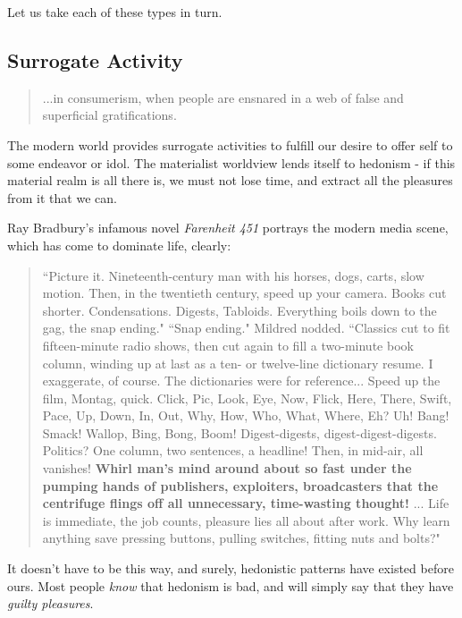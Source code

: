 \documentclass[letterpaper]{article}
\begin{document}
Let us take each of these types in turn.

\subsection{Surrogate Activity}

\begin{quote}
  ...in consumerism, when people are ensnared in a web of false and superficial gratifications.
\end{quote}

The modern world provides surrogate activities to fulfill our desire to offer self to some endeavor or idol. The materialist worldview lends itself to hedonism - if this material realm is all there is, we must not lose time, and extract all the pleasures from it that we can. 


Ray Bradbury's infamous novel \textit{Farenheit 451} portrays the modern media scene, which has come to dominate life, clearly:

\begin{quote}
  ``Picture it. Nineteenth-century man with his horses, dogs, carts, slow motion. Then, in the twentieth century, speed up your camera. Books cut shorter. Condensations. Digests, Tabloids. Everything boils down to the gag, the snap ending." ``Snap ending." Mildred nodded. ``Classics cut to fit fifteen-minute radio shows, then cut again to fill a two-minute book column, winding up at last as a ten- or twelve-line dictionary resume. I exaggerate, of course. The dictionaries were for reference... Speed up the film, Montag, quick. Click, Pic, Look, Eye, Now, Flick, Here, There, Swift, Pace, Up, Down, In, Out, Why, How, Who, What, Where, Eh? Uh! Bang! Smack! Wallop, Bing, Bong, Boom! Digest-digests, digest-digest-digests. Politics? One column, two sentences, a headline! Then, in mid-air, all vanishes! \textbf{Whirl man’s mind around about so fast under the pumping hands of publishers, exploiters, broadcasters that the centrifuge flings off all unnecessary, time-wasting thought!} ... Life is immediate, the job counts, pleasure lies all about after work. Why learn anything save pressing buttons, pulling switches, fitting nuts and bolts?"
\end{quote}

It doesn't have to be this way, and surely, hedonistic patterns have existed before ours. Most people \textit{know} that hedonism is bad, and will simply say that they have \textit{guilty pleasures}. 
\end{document}
